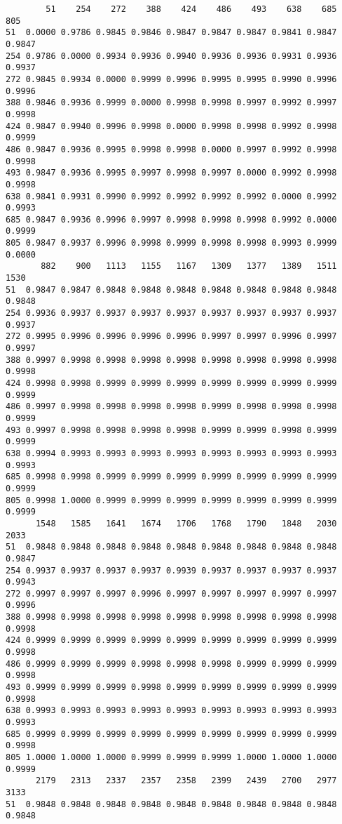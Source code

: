 \documentclass[
]{report}
\begin{document}
\begin{verbatim}
        51    254    272    388    424    486    493    638    685    805
51  0.0000 0.9786 0.9845 0.9846 0.9847 0.9847 0.9847 0.9841 0.9847 0.9847
254 0.9786 0.0000 0.9934 0.9936 0.9940 0.9936 0.9936 0.9931 0.9936 0.9937
272 0.9845 0.9934 0.0000 0.9999 0.9996 0.9995 0.9995 0.9990 0.9996 0.9996
388 0.9846 0.9936 0.9999 0.0000 0.9998 0.9998 0.9997 0.9992 0.9997 0.9998
424 0.9847 0.9940 0.9996 0.9998 0.0000 0.9998 0.9998 0.9992 0.9998 0.9999
486 0.9847 0.9936 0.9995 0.9998 0.9998 0.0000 0.9997 0.9992 0.9998 0.9998
493 0.9847 0.9936 0.9995 0.9997 0.9998 0.9997 0.0000 0.9992 0.9998 0.9998
638 0.9841 0.9931 0.9990 0.9992 0.9992 0.9992 0.9992 0.0000 0.9992 0.9993
685 0.9847 0.9936 0.9996 0.9997 0.9998 0.9998 0.9998 0.9992 0.0000 0.9999
805 0.9847 0.9937 0.9996 0.9998 0.9999 0.9998 0.9998 0.9993 0.9999 0.0000
       882    900   1113   1155   1167   1309   1377   1389   1511   1530
51  0.9847 0.9847 0.9848 0.9848 0.9848 0.9848 0.9848 0.9848 0.9848 0.9848
254 0.9936 0.9937 0.9937 0.9937 0.9937 0.9937 0.9937 0.9937 0.9937 0.9937
272 0.9995 0.9996 0.9996 0.9996 0.9996 0.9997 0.9997 0.9996 0.9997 0.9997
388 0.9997 0.9998 0.9998 0.9998 0.9998 0.9998 0.9998 0.9998 0.9998 0.9998
424 0.9998 0.9998 0.9999 0.9999 0.9999 0.9999 0.9999 0.9999 0.9999 0.9999
486 0.9997 0.9998 0.9998 0.9998 0.9998 0.9999 0.9998 0.9998 0.9998 0.9999
493 0.9997 0.9998 0.9998 0.9998 0.9998 0.9999 0.9999 0.9998 0.9999 0.9999
638 0.9994 0.9993 0.9993 0.9993 0.9993 0.9993 0.9993 0.9993 0.9993 0.9993
685 0.9998 0.9998 0.9999 0.9999 0.9999 0.9999 0.9999 0.9999 0.9999 0.9999
805 0.9998 1.0000 0.9999 0.9999 0.9999 0.9999 0.9999 0.9999 0.9999 0.9999
      1548   1585   1641   1674   1706   1768   1790   1848   2030   2033
51  0.9848 0.9848 0.9848 0.9848 0.9848 0.9848 0.9848 0.9848 0.9848 0.9847
254 0.9937 0.9937 0.9937 0.9937 0.9939 0.9937 0.9937 0.9937 0.9937 0.9943
272 0.9997 0.9997 0.9997 0.9996 0.9997 0.9997 0.9997 0.9997 0.9997 0.9996
388 0.9998 0.9998 0.9998 0.9998 0.9998 0.9998 0.9998 0.9998 0.9998 0.9998
424 0.9999 0.9999 0.9999 0.9999 0.9999 0.9999 0.9999 0.9999 0.9999 0.9998
486 0.9999 0.9999 0.9999 0.9998 0.9998 0.9998 0.9999 0.9999 0.9999 0.9998
493 0.9999 0.9999 0.9999 0.9998 0.9999 0.9999 0.9999 0.9999 0.9999 0.9998
638 0.9993 0.9993 0.9993 0.9993 0.9993 0.9993 0.9993 0.9993 0.9993 0.9993
685 0.9999 0.9999 0.9999 0.9999 0.9999 0.9999 0.9999 0.9999 0.9999 0.9998
805 1.0000 1.0000 1.0000 0.9999 0.9999 0.9999 1.0000 1.0000 1.0000 0.9999
      2179   2313   2337   2357   2358   2399   2439   2700   2977   3133
51  0.9848 0.9848 0.9848 0.9848 0.9848 0.9848 0.9848 0.9848 0.9848 0.9848

\end{verbatim}
\end{document}
